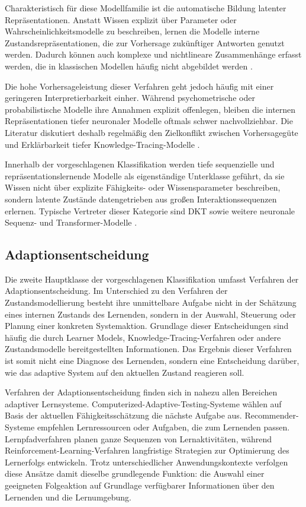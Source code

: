 Charakteristisch für diese Modellfamilie ist die automatische Bildung
latenter Repräsentationen. Anstatt Wissen explizit über Parameter oder
Wahrscheinlichkeitsmodelle zu beschreiben, lernen die Modelle interne
Zustandsrepräsentationen, die zur Vorhersage zukünftiger Antworten
genutzt werden. Dadurch können auch komplexe und nichtlineare
Zusammenhänge erfasst werden, die in klassischen Modellen häufig nicht
abgebildet werden \citep{Shen2024}.

Die hohe Vorhersageleistung dieser Verfahren geht jedoch häufig mit
einer geringeren Interpretierbarkeit einher. Während psychometrische
oder probabilistische Modelle ihre Annahmen explizit offenlegen, bleiben
die internen Repräsentationen tiefer neuronaler Modelle oftmals schwer
nachvollziehbar. Die Literatur diskutiert deshalb regelmäßig den
Zielkonflikt zwischen Vorhersagegüte und Erklärbarkeit tiefer
Knowledge-Tracing-Modelle \citep{Shen2024}.

Innerhalb der vorgeschlagenen Klassifikation werden tiefe sequenzielle
und repräsentationslernende Modelle als eigenständige Unterklasse
geführt, da sie Wissen nicht über explizite Fähigkeits- oder
Wissensparameter beschreiben, sondern latente Zustände datengetrieben
aus großen Interaktionssequenzen erlernen. Typische Vertreter dieser
Kategorie sind DKT sowie weitere neuronale Sequenz- und
Transformer-Modelle \citep{Shen2024}.

\subsection{Adaptionsentscheidung}\label{adaptionsentscheidung}

Die zweite Hauptklasse der vorgeschlagenen Klassifikation umfasst
Verfahren der Adaptionsentscheidung. Im Unterschied zu den Verfahren der
Zustandsmodellierung besteht ihre unmittelbare Aufgabe nicht in der
Schätzung eines internen Zustands des Lernenden, sondern in der Auswahl,
Steuerung oder Planung einer konkreten Systemaktion. Grundlage dieser
Entscheidungen sind häufig die durch Learner Models,
Knowledge-Tracing-Verfahren oder andere Zustandsmodelle bereitgestellten
Informationen. Das Ergebnis dieser Verfahren ist somit nicht eine
Diagnose des Lernenden, sondern eine Entscheidung darüber, wie das
adaptive System auf den aktuellen Zustand reagieren soll.

Verfahren der Adaptionsentscheidung finden sich in nahezu allen
Bereichen adaptiver Lernsysteme. Computerized-Adaptive-Testing-Systeme
wählen auf Basis der aktuellen Fähigkeitsschätzung die nächste Aufgabe
aus. Recommender-Systeme empfehlen Lernressourcen oder Aufgaben, die zum
Lernenden passen. Lernpfadverfahren planen ganze Sequenzen von
Lernaktivitäten, während Reinforcement-Learning-Verfahren langfristige
Strategien zur Optimierung des Lernerfolgs entwickeln. Trotz
unterschiedlicher Anwendungskontexte verfolgen diese Ansätze damit
dieselbe grundlegende Funktion: die Auswahl einer geeigneten Folgeaktion
auf Grundlage verfügbarer Informationen über den Lernenden und die
Lernumgebung.

